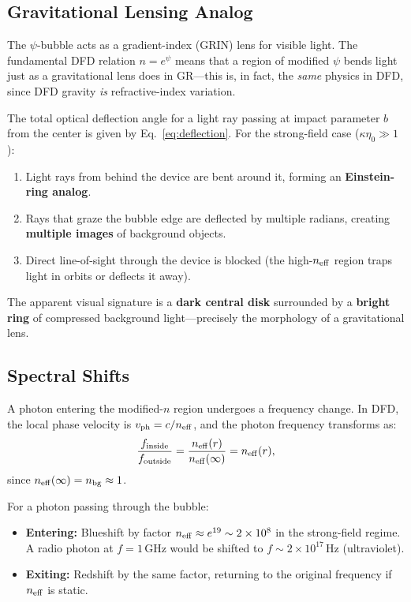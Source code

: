 \documentclass[11pt]{article}
\newcommand{\neff}{n_{\rm eff}}
\newcommand{\vph}{v_{\rm ph}}
\begin{document}
\subsection{Gravitational Lensing Analog}

The $\psi$-bubble acts as a gradient-index (GRIN) lens for visible light.
The fundamental DFD relation $n = e^\psi$ means that a region of modified
$\psi$ bends light just as a gravitational lens does in GR---this is, in
fact, the \emph{same} physics in DFD, since DFD gravity \emph{is}
refractive-index variation.

The total optical deflection angle for a light ray passing at impact
parameter $b$ from the center is given by Eq.~\eqref{eq:deflection}.
For the strong-field case ($\kappa\eta_0 \gg 1$):

\begin{enumerate}[noitemsep]
\item Light rays from behind the device are bent around it, forming
  an \textbf{Einstein-ring analog}.
\item Rays that graze the bubble edge are deflected by multiple radians,
  creating \textbf{multiple images} of background objects.
\item Direct line-of-sight through the device is blocked (the
  high-$\neff$ region traps light in orbits or deflects it away).
\end{enumerate}

The apparent visual signature is a \textbf{dark central disk} surrounded
by a \textbf{bright ring} of compressed background light---precisely the
morphology of a gravitational lens.

\subsection{Spectral Shifts}

A photon entering the modified-$n$ region undergoes a frequency change.
In DFD, the local phase velocity is $\vph = c/\neff$, and the photon
frequency transforms as:
\begin{equation}\label{eq:freq-shift}
\frac{f_{\rm inside}}{f_{\rm outside}} = \frac{\neff(r)}{\neff(\infty)} = \neff(r),
\end{equation}
since $\neff(\infty) = n_{\rm bg} \approx 1$.

For a photon passing through the bubble:
\begin{itemize}[noitemsep]
\item \textbf{Entering:} Blueshift by factor $\neff \approx e^{19} \sim
  2 \times 10^8$ in the strong-field regime. A radio photon at $f = 1$\,GHz
  would be shifted to $f \sim 2 \times 10^{17}$\,Hz (ultraviolet).
\item \textbf{Exiting:} Redshift by the same factor, returning to
  the original frequency if $\neff$ is static.
\end{itemize}
\end{document}
